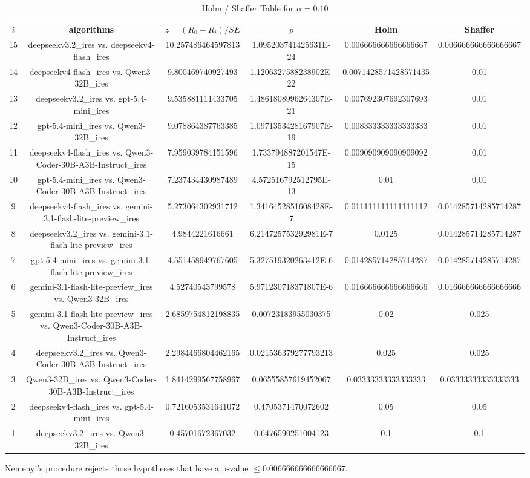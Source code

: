 \documentclass[a4paper,10pt]{article}
\begin{document}
\begin{landscape}
\begin{table}[!htp]
\centering\tiny
\caption{Holm / Shaffer Table for $\alpha=0.10$}
\begin{tabular}{cccccc}
$i$&algorithms&$z=(R_0 - R_i)/SE$&$p$&Holm&Shaffer\\
\hline
15&deepseekv3.2_ires vs. deepseekv4-flash_ires&10.257486464597813&1.095203741425631E-24&0.006666666666666667&0.006666666666666667\\14&deepseekv4-flash_ires vs. Qwen3-32B_ires&9.800469740927493&1.1206327588238902E-22&0.0071428571428571435&0.01\\13&deepseekv3.2_ires vs. gpt-5.4-mini_ires&9.535881111433705&1.4861808996264307E-21&0.007692307692307693&0.01\\12&gpt-5.4-mini_ires vs. Qwen3-32B_ires&9.078864387763385&1.0971353428167907E-19&0.008333333333333333&0.01\\11&deepseekv4-flash_ires vs. Qwen3-Coder-30B-A3B-Instruct_ires&7.959039784151596&1.733794887201547E-15&0.009090909090909092&0.01\\10&gpt-5.4-mini_ires vs. Qwen3-Coder-30B-A3B-Instruct_ires&7.237434430987489&4.572516792512795E-13&0.01&0.01\\9&deepseekv4-flash_ires vs. gemini-3.1-flash-lite-preview_ires&5.273064302931712&1.3416452851608428E-7&0.011111111111111112&0.014285714285714287\\8&deepseekv3.2_ires vs. gemini-3.1-flash-lite-preview_ires&4.9844221616661&6.214725753292981E-7&0.0125&0.014285714285714287\\7&gpt-5.4-mini_ires vs. gemini-3.1-flash-lite-preview_ires&4.551458949767605&5.327519320263412E-6&0.014285714285714287&0.014285714285714287\\6&gemini-3.1-flash-lite-preview_ires vs. Qwen3-32B_ires&4.52740543799578&5.971230718371807E-6&0.016666666666666666&0.016666666666666666\\5&gemini-3.1-flash-lite-preview_ires vs. Qwen3-Coder-30B-A3B-Instruct_ires&2.6859754812198835&0.00723183955030375&0.02&0.025\\4&deepseekv3.2_ires vs. Qwen3-Coder-30B-A3B-Instruct_ires&2.2984466804462165&0.021536379277793213&0.025&0.025\\3&Qwen3-32B_ires vs. Qwen3-Coder-30B-A3B-Instruct_ires&1.8414299567758967&0.06555857619452067&0.03333333333333333&0.03333333333333333\\2&deepseekv4-flash_ires vs. gpt-5.4-mini_ires&0.7216053531641072&0.4705371470072602&0.05&0.05\\1&deepseekv3.2_ires vs. Qwen3-32B_ires&0.45701672367032&0.6476590251004123&0.1&0.1\\\hline
\end{tabular}
\end{table}
Nemenyi's procedure rejects those hypotheses that have a p-value $\le0.006666666666666667$.



\end{landscape}
\end{document}
